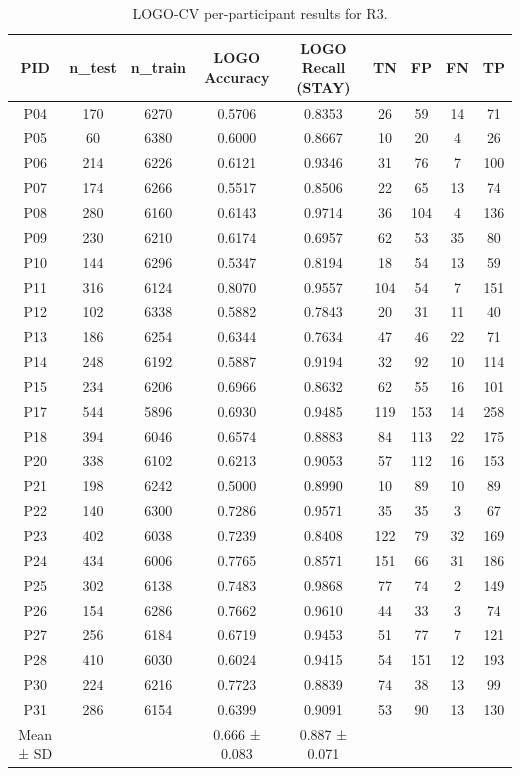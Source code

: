 \begin{table}[hptb]
\small
\centering
\begin{table}
\caption{LOGO-CV per-participant results for R3.}
\label{tab:table4_logo_r3}
\begin{tabular}{ccccccccc}
\toprule
PID & n_test & n_train & LOGO Accuracy & LOGO Recall (STAY) & TN & FP & FN & TP \\
\midrule
P04 & 170 & 6270 & 0.5706 & 0.8353 & 26 & 59 & 14 & 71 \\
P05 & 60 & 6380 & 0.6000 & 0.8667 & 10 & 20 & 4 & 26 \\
P06 & 214 & 6226 & 0.6121 & 0.9346 & 31 & 76 & 7 & 100 \\
P07 & 174 & 6266 & 0.5517 & 0.8506 & 22 & 65 & 13 & 74 \\
P08 & 280 & 6160 & 0.6143 & 0.9714 & 36 & 104 & 4 & 136 \\
P09 & 230 & 6210 & 0.6174 & 0.6957 & 62 & 53 & 35 & 80 \\
P10 & 144 & 6296 & 0.5347 & 0.8194 & 18 & 54 & 13 & 59 \\
P11 & 316 & 6124 & 0.8070 & 0.9557 & 104 & 54 & 7 & 151 \\
P12 & 102 & 6338 & 0.5882 & 0.7843 & 20 & 31 & 11 & 40 \\
P13 & 186 & 6254 & 0.6344 & 0.7634 & 47 & 46 & 22 & 71 \\
P14 & 248 & 6192 & 0.5887 & 0.9194 & 32 & 92 & 10 & 114 \\
P15 & 234 & 6206 & 0.6966 & 0.8632 & 62 & 55 & 16 & 101 \\
P17 & 544 & 5896 & 0.6930 & 0.9485 & 119 & 153 & 14 & 258 \\
P18 & 394 & 6046 & 0.6574 & 0.8883 & 84 & 113 & 22 & 175 \\
P20 & 338 & 6102 & 0.6213 & 0.9053 & 57 & 112 & 16 & 153 \\
P21 & 198 & 6242 & 0.5000 & 0.8990 & 10 & 89 & 10 & 89 \\
P22 & 140 & 6300 & 0.7286 & 0.9571 & 35 & 35 & 3 & 67 \\
P23 & 402 & 6038 & 0.7239 & 0.8408 & 122 & 79 & 32 & 169 \\
P24 & 434 & 6006 & 0.7765 & 0.8571 & 151 & 66 & 31 & 186 \\
P25 & 302 & 6138 & 0.7483 & 0.9868 & 77 & 74 & 2 & 149 \\
P26 & 154 & 6286 & 0.7662 & 0.9610 & 44 & 33 & 3 & 74 \\
P27 & 256 & 6184 & 0.6719 & 0.9453 & 51 & 77 & 7 & 121 \\
P28 & 410 & 6030 & 0.6024 & 0.9415 & 54 & 151 & 12 & 193 \\
P30 & 224 & 6216 & 0.7723 & 0.8839 & 74 & 38 & 13 & 99 \\
P31 & 286 & 6154 & 0.6399 & 0.9091 & 53 & 90 & 13 & 130 \\
Mean ± SD &  &  & 0.666 ± 0.083 & 0.887 ± 0.071 &  &  &  &  \\
\bottomrule
\end{tabular}
\end{table}
\end{table}
